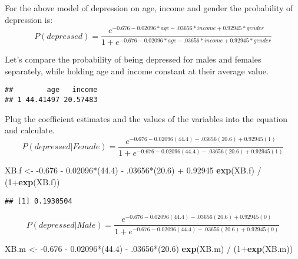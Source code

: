 \documentclass[]{article}
\newenvironment{Shaded}{\begin{snugshade}}{\end{snugshade}}
\newcommand{\KeywordTok}[1]{\textcolor[rgb]{0.13,0.29,0.53}{\textbf{{#1}}}}
\newcommand{\DataTypeTok}[1]{\textcolor[rgb]{0.13,0.29,0.53}{{#1}}}
\newcommand{\DecValTok}[1]{\textcolor[rgb]{0.00,0.00,0.81}{{#1}}}
\newcommand{\FloatTok}[1]{\textcolor[rgb]{0.00,0.00,0.81}{{#1}}}
\newcommand{\StringTok}[1]{\textcolor[rgb]{0.31,0.60,0.02}{{#1}}}
\newcommand{\NormalTok}[1]{{#1}}
\begin{document}
For the above model of depression on age, income and gender the
probability of depression is: \[
P(depressed) = \frac{e^{-0.676 - 0.02096*age - .03656*income + 0.92945*gender}}
{1 + e^{-0.676 - 0.02096*age - .03656*income + 0.92945*gender}}
\]

Let's compare the probability of being depressed for males and females
separately, while holding age and income constant at their average
value.

\begin{Shaded}
\end{Shaded}

\begin{verbatim}
##        age   income
## 1 44.41497 20.57483
\end{verbatim}

Plug the coefficient estimates and the values of the variables into the
equation and calculate. \[
P(depressed|Female) = \frac{e^{-0.676 - 0.02096(44.4) - .03656(20.6) + 0.92945(1)}}
{1 + e^{-0.676 - 0.02096(44.4) - .03656(20.6) + 0.92945(1)}}
\]

\begin{Shaded}
\begin{Highlighting}[]
\NormalTok{XB.f <-}\StringTok{ }\NormalTok{-}\FloatTok{0.676} \NormalTok{-}\StringTok{ }\FloatTok{0.02096}\NormalTok{*(}\FloatTok{44.4}\NormalTok{) -}\StringTok{ }\NormalTok{.}\DecValTok{03656}\NormalTok{*(}\FloatTok{20.6}\NormalTok{) +}\StringTok{ }\FloatTok{0.92945}
\KeywordTok{exp}\NormalTok{(XB.f) /}\StringTok{ }\NormalTok{(}\DecValTok{1}\NormalTok{+}\KeywordTok{exp}\NormalTok{(XB.f))}
\end{Highlighting}
\end{Shaded}

\begin{verbatim}
## [1] 0.1930504
\end{verbatim}

\[
P(depressed|Male) = \frac{e^{-0.676 - 0.02096(44.4) - .03656(20.6) + 0.92945(0)}}
{1 + e^{-0.676 - 0.02096(44.4) - .03656(20.6) + 0.92945(0)}}
\]

\begin{Shaded}
\begin{Highlighting}[]
\NormalTok{XB.m <-}\StringTok{ }\NormalTok{-}\FloatTok{0.676} \NormalTok{-}\StringTok{ }\FloatTok{0.02096}\NormalTok{*(}\FloatTok{44.4}\NormalTok{) -}\StringTok{ }\NormalTok{.}\DecValTok{03656}\NormalTok{*(}\FloatTok{20.6}\NormalTok{)}
\KeywordTok{exp}\NormalTok{(XB.m) /}\StringTok{ }\NormalTok{(}\DecValTok{1}\NormalTok{+}\KeywordTok{exp}\NormalTok{(XB.m))}
\end{Highlighting}
\end{Shaded}
\end{document}
